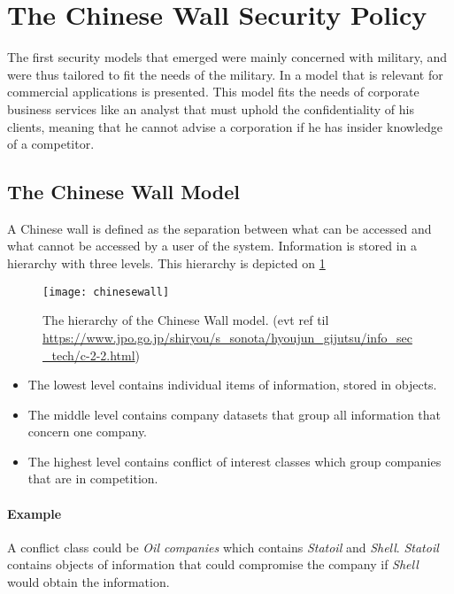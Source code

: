 \section{The Chinese Wall Security Policy}

The first security models that emerged were mainly concerned with military, and were thus tailored to fit the needs of the military. 
In \cite{brewer1989chinese} a model that is relevant for commercial applications is presented.
This model fits the needs of corporate business services like an analyst that must uphold the confidentiality of his clients, meaning that he cannot advise a corporation if he has insider knowledge of a competitor. \cite{brewer1989chinese}

\subsection*{The Chinese Wall Model}
A Chinese wall is defined as the separation between what can be accessed and what cannot be accessed by a user of the system.
Information is stored in a hierarchy with three levels. 
This hierarchy is depicted on \cref{hierarchy}

\begin{figure}
	\texttt{[image: chinesewall]}
	\caption{The hierarchy of the Chinese Wall model. (evt ref til \url{https://www.jpo.go.jp/shiryou/s_sonota/hyoujun_gijutsu/info_sec_tech/c-2-2.html})}
	\label{hierarchy}
\end{figure}

\begin{itemize}
	\item The lowest level contains individual items of information, stored in objects.
	\item The middle level contains company datasets that group all information that concern one company. 
	\item The highest level contains conflict of interest classes which group companies that are in competition.
\end{itemize}

\paragraph{Example} A conflict class could be \emph{Oil companies} which contains \emph{Statoil} and \emph{Shell}. \emph{Statoil} contains objects of information that could compromise the company if \emph{Shell} would obtain the information.


